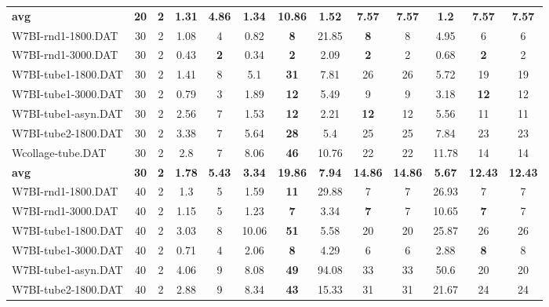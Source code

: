 \begin{table}[h]
{\begin{tabular}{lcccccccccccc}
\cline{1-13} \textbf{avg} & \textbf{20} & \textbf{2} & \textbf{1.31} & \textbf{4.86} & \textbf{1.34} & \textbf{10.86} & \textbf{1.52} & \textbf{7.57} & \textbf{7.57} & \textbf{1.2} & \textbf{7.57} & \textbf{7.57} \\ \cline{1-13}
W7BI-rnd1-1800.DAT & 30 & 2 & 1.08 & 4 &  \textcolor{blue2}{0.82} &  \textbf{8} & 21.85 &  \textbf{8} & 8 & 4.95 & 6 & 6 \\
W7BI-rnd1-3000.DAT & 30 & 2 & 0.43 &  \textbf{2} &  \textcolor{blue2}{0.34} &  \textbf{2} & 2.09 &  \textbf{2} & 2 & 0.68 &  \textbf{2} & 2 \\
W7BI-tube1-1800.DAT & 30 & 2 &  \textcolor{blue2}{1.41} & 8 & 5.1 &  \textbf{31} & 7.81 & 26 & 26 & 5.72 & 19 & 19 \\
W7BI-tube1-3000.DAT & 30 & 2 &  \textcolor{blue2}{0.79} & 3 & 1.89 &  \textbf{12} & 5.49 & 9 & 9 & 3.18 &  \textbf{12} & 12 \\
W7BI-tube1-asyn.DAT & 30 & 2 & 2.56 & 7 &  \textcolor{blue2}{1.53} &  \textbf{12} & 2.21 &  \textbf{12} & 12 & 5.56 & 11 & 11 \\
W7BI-tube2-1800.DAT & 30 & 2 &  \textcolor{blue2}{3.38} & 7 & 5.64 &  \textbf{28} & 5.4 & 25 & 25 & 7.84 & 23 & 23 \\
Wcollage-tube.DAT & 30 & 2 &  \textcolor{blue2}{2.8} & 7 & 8.06 &  \textbf{46} & 10.76 & 22 & 22 & 11.78 & 14 & 14 \\
\cline{1-13} \textbf{avg} & \textbf{30} & \textbf{2} & \textbf{1.78} & \textbf{5.43} & \textbf{3.34} & \textbf{19.86} & \textbf{7.94} & \textbf{14.86} & \textbf{14.86} & \textbf{5.67} & \textbf{12.43} & \textbf{12.43} \\ \cline{1-13}
W7BI-rnd1-1800.DAT & 40 & 2 &  \textcolor{blue2}{1.3} & 5 & 1.59 &  \textbf{11} & 29.88 & 7 & 7 & 26.93 & 7 & 7 \\
W7BI-rnd1-3000.DAT & 40 & 2 &  \textcolor{blue2}{1.15} & 5 & 1.23 &  \textbf{7} & 3.34 &  \textbf{7} & 7 & 10.65 &  \textbf{7} & 7 \\
W7BI-tube1-1800.DAT & 40 & 2 &  \textcolor{blue2}{3.03} & 8 & 10.06 &  \textbf{51} & 5.58 & 20 & 20 & 25.87 & 26 & 26 \\
W7BI-tube1-3000.DAT & 40 & 2 &  \textcolor{blue2}{0.71} & 4 & 2.06 &  \textbf{8} & 4.29 & 6 & 6 & 2.88 &  \textbf{8} & 8 \\
W7BI-tube1-asyn.DAT & 40 & 2 &  \textcolor{blue2}{4.06} & 9 & 8.08 &  \textbf{49} & 94.08 & 33 & 33 & 50.6 & 20 & 20 \\
W7BI-tube2-1800.DAT & 40 & 2 &  \textcolor{blue2}{2.88} & 9 & 8.34 &  \textbf{43} & 15.33 & 31 & 31 & 21.67 & 24 & 24 \\

\end{tabular}}
\end{table}
